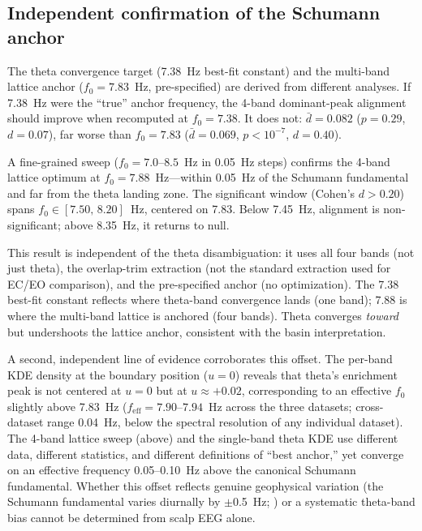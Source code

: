 \documentclass[11pt,a4paper]{article}
\newcommand{\fzero}{f_0}
\begin{document}
\subsection{Independent confirmation of the Schumann anchor}
\label{sec:anchor_confirmation}

The theta convergence target (7.38~Hz best-fit constant) and the multi-band lattice anchor ($\fzero = 7.83$~Hz, pre-specified) are derived from different analyses. If 7.38~Hz were the ``true'' anchor frequency, the 4-band dominant-peak alignment should improve when recomputed at $\fzero = 7.38$. It does not: $\bar{d} = 0.082$ ($p = 0.29$, $d = 0.07$), far worse than $\fzero = 7.83$ ($\bar{d} = 0.069$, $p < 10^{-7}$, $d = 0.40$).

A fine-grained sweep ($\fzero = 7.0$--$8.5$~Hz in 0.05~Hz steps) confirms the 4-band lattice optimum at $\fzero = 7.88$~Hz---within 0.05~Hz of the Schumann fundamental and far from the theta landing zone. The significant window (Cohen's $d > 0.20$) spans $\fzero \in [7.50,\, 8.20]$~Hz, centered on 7.83. Below 7.45~Hz, alignment is non-significant; above 8.35~Hz, it returns to null.

This result is independent of the theta disambiguation: it uses all four bands (not just theta), the overlap-trim extraction (not the standard extraction used for EC/EO comparison), and the pre-specified anchor (no optimization). The 7.38 best-fit constant reflects where theta-band convergence lands (one band); 7.88 is where the multi-band lattice is anchored (four bands). Theta converges \textit{toward} but undershoots the lattice anchor, consistent with the basin interpretation.

A second, independent line of evidence corroborates this offset. The per-band KDE density at the boundary position ($u = 0$) reveals that theta's enrichment peak is not centered at $u = 0$ but at $u \approx +0.02$, corresponding to an effective $\fzero$ slightly above 7.83~Hz ($f_{\text{eff}} = 7.90$--$7.94$~Hz across the three datasets; cross-dataset range 0.04~Hz, below the spectral resolution of any individual dataset). The 4-band lattice sweep (above) and the single-band theta KDE use different data, different statistics, and different definitions of ``best anchor,'' yet converge on an effective frequency 0.05--0.10~Hz above the canonical Schumann fundamental. Whether this offset reflects genuine geophysical variation (the Schumann fundamental varies diurnally by $\pm$0.5~Hz; \cite{Nickolaenko2014}) or a systematic theta-band bias cannot be determined from scalp EEG alone.
\end{document}
